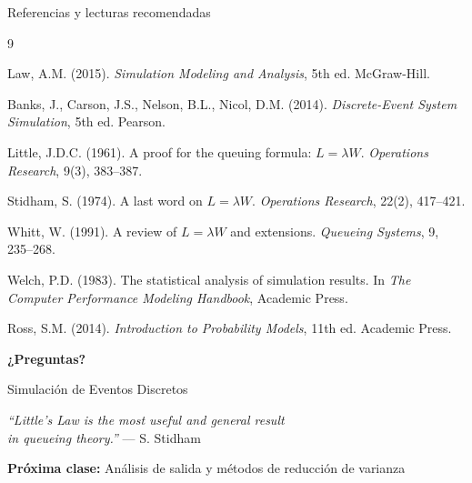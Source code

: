 \documentclass[aspectratio=1610, 9pt]{beamer}
\begin{document}
\begin{frame}{Referencias y lecturas recomendadas}

\begin{thebibliography}{9}
\small

 Law, A.M. (2015). \textit{Simulation Modeling and Analysis}, 5th ed. McGraw-Hill.

 Banks, J., Carson, J.S., Nelson, B.L., Nicol, D.M. (2014). \textit{Discrete-Event System Simulation}, 5th ed. Pearson.

 Little, J.D.C. (1961). A proof for the queuing formula: $L = \lambda W$. \textit{Operations Research}, 9(3), 383--387.

 Stidham, S. (1974). A last word on $L = \lambda W$. \textit{Operations Research}, 22(2), 417--421.

 Whitt, W. (1991). A review of $L = \lambda W$ and extensions. \textit{Queueing Systems}, 9, 235--268.

 Welch, P.D. (1983). The statistical analysis of simulation results. In \textit{The Computer Performance Modeling Handbook}, Academic Press.

 Ross, S.M. (2014). \textit{Introduction to Probability Models}, 11th ed. Academic Press.

\end{thebibliography}
\end{frame}

\begin{frame}{}

\begin{center}
\vspace{1cm}
{\Huge\textbf{¿Preguntas?}}

\vspace{1cm}
{\large Simulación de Eventos Discretos}

\vspace{0.5cm}
{\large\textit{``Little's Law is the most useful and general result\\in queueing theory.''} --- S. Stidham}

\vspace{1cm}
\textbf{Próxima clase:} Análisis de salida y métodos de reducción de varianza
\end{center}
\end{frame}
\end{document}
